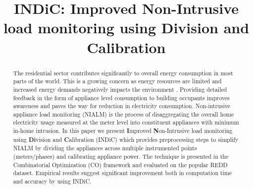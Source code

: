 \documentclass[conference]{IEEEtran}
\newcommand{\indic}{INDiC}
\begin{document}
%
\title{INDiC: Improved Non-Intrusive load monitoring using Division and Calibration}


\author{
\and
{}
\and
{}
}
\maketitle


\begin{abstract}
The residential sector contributes significantly to overall energy consumption in most parts of the world. This is a growing concern as energy resources are limited and increased energy demands negatively impacts the environment \cite{survey2}. Providing detailed feedback in the form of appliance level consumption to building occupants improves awareness and paves the way for reduction in 
electricity consumption. Non-intrusive appliance load monitoring (NIALM) is the process of disaggregating the overall home electricity usage measured at the meter level into constituent appliances with minimum in-home intrusion. In this paper we present \textbf{I}mproved \textbf{N}on-Intrusive load monitoring using \textbf{Di}vision and \textbf{C}alibration (\indic) which provides preprocessing steps to simplify NIALM by dividing the appliances across multiple instrumented points (meters/phases) and calibrating appliance power. The technique is presented in the Combinatorial Optimization (CO) framework and evaluated on the popular REDD dataset. Empirical results suggest significant improvement both in computation time and accuracy by using \indic.
\end{abstract}
\IEEEpeerreviewmaketitle
\end{document}
